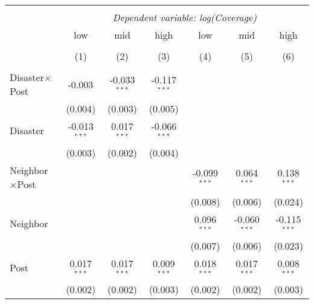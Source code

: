 
\begin{tabular}{@{\extracolsep{5pt}}lcccccc}
\\[-1.8ex]\hline
\hline \\[-1.8ex]
& \multicolumn{6}{c}{\textit{Dependent variable: log(Coverage)}} \
\cr \cline{2-7}
\\[-1.8ex] & \multicolumn{1}{c}{low} & \multicolumn{1}{c}{mid} & \multicolumn{1}{c}{high} & \multicolumn{1}{c}{low} & \multicolumn{1}{c}{mid} & \multicolumn{1}{c}{high}  \\
\\[-1.8ex] & (1) & (2) & (3) & (4) & (5) & (6) \\
\hline \\[-1.8ex]
 Disaster$\times$Post & -0.003$^{}$ & -0.033$^{***}$ & -0.117$^{***}$ & & & \\
& (0.004) & (0.003) & (0.005) & & & \\
 Disaster & -0.013$^{***}$ & 0.017$^{***}$ & -0.066$^{***}$ & & & \\
& (0.003) & (0.002) & (0.004) & & & \\
 Neighbor$\times$Post & & & & -0.099$^{***}$ & 0.064$^{***}$ & 0.138$^{***}$ \\
& & & & (0.008) & (0.006) & (0.024) \\
 Neighbor & & & & 0.096$^{***}$ & -0.060$^{***}$ & -0.115$^{***}$ \\
& & & & (0.007) & (0.006) & (0.023) \\
 Post & 0.017$^{***}$ & 0.017$^{***}$ & 0.009$^{***}$ & 0.018$^{***}$ & 0.017$^{***}$ & 0.008$^{***}$ \\
& (0.002) & (0.002) & (0.003) & (0.002) & (0.002) & (0.003) \\

\end{tabular}
